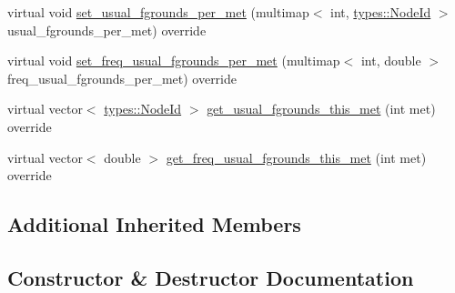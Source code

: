 \begin{DoxyCompactItemize}
virtual void \mbox{\hyperlink{class_harbour_a27f372be53f0c5b8ed44e9eaf7377209}{set\+\_\+usual\+\_\+fgrounds\+\_\+per\+\_\+met}} (multimap$<$ int, \mbox{\hyperlink{classtypes_1_1_node_id}{types\+::\+Node\+Id}} $>$ usual\+\_\+fgrounds\+\_\+per\+\_\+met) override
\item 
virtual void \mbox{\hyperlink{class_harbour_a2cdc3a58a3a649f0ba6eed57ca977701}{set\+\_\+freq\+\_\+usual\+\_\+fgrounds\+\_\+per\+\_\+met}} (multimap$<$ int, double $>$ freq\+\_\+usual\+\_\+fgrounds\+\_\+per\+\_\+met) override
\item 
virtual vector$<$ \mbox{\hyperlink{classtypes_1_1_node_id}{types\+::\+Node\+Id}} $>$ \mbox{\hyperlink{class_harbour_a324bed1382950129e692eb3e4302d700}{get\+\_\+usual\+\_\+fgrounds\+\_\+this\+\_\+met}} (int met) override
\item 
virtual vector$<$ double $>$ \mbox{\hyperlink{class_harbour_a9702a762029d20bb8885e7f6d8ec0f94}{get\+\_\+freq\+\_\+usual\+\_\+fgrounds\+\_\+this\+\_\+met}} (int met) override
\end{DoxyCompactItemize}
\subsection*{Additional Inherited Members}


\subsection{Constructor \& Destructor Documentation}
\mbox{\label{class_harbour_ad6115cf7a5ec4a65e985a1db5a1f4bd2}} 

